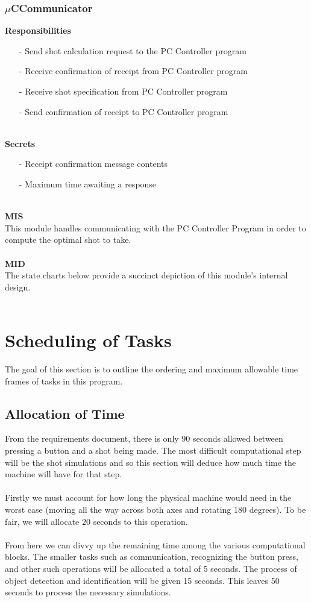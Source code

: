 \documentclass[titlepage]{article}
\begin{document}
\subsubsection{$\mu$CCommunicator}
\textbf{Responsibilities}
\begin{itemize}
	\item[-] Send shot calculation request to the PC Controller program
	\item[-] Receive confirmation of receipt from PC Controller program
	\item[-] Receive shot specification from PC Controller program
	\item[-] Send confirmation of receipt to PC Controller program 
\end{itemize}~\\
\textbf{Secrets}
\begin{itemize}
	\item[-] Receipt confirmation message contents
	\item[-] Maximum time awaiting a response
\end{itemize}~\\
\textbf{MIS}\\[2mm]
This module handles communicating with the PC Controller Program in order to compute the optimal shot to take.
\\\\
\textbf{MID}\\[2mm]
The state charts below provide a succinct depiction of this module's internal design.
\\\\

\section{Scheduling of Tasks}
The goal of this section is to outline the ordering and maximum allowable time frames of tasks in this program.
\subsection{Allocation of Time}
From the requirements document, there is only 90 seconds allowed between pressing a button and a shot being made. The most difficult computational step will be the shot simulations and so this section will deduce how much time the machine will have for that step.\\~\\
Firstly we must account for how long the physical machine would need in the worst case (moving all the way across both axes and rotating 180 degrees). To be fair, we will allocate 20 seconds to this operation.\\~\\
From here we can divvy up the remaining time among the various computational blocks. The smaller tasks such as communication, recognizing the button press, and other such operations will be allocated a total of 5 seconds. The process of object detection and identification will be given 15 seconds. This leaves 50 seconds to process the necessary simulations.
\newpage
\end{document}
